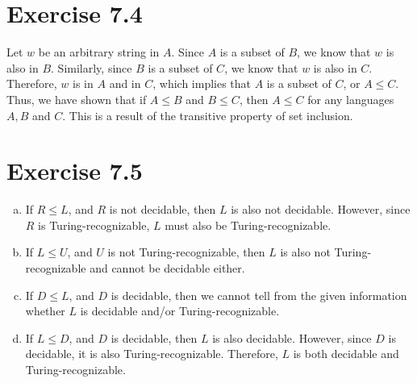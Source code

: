 \documentclass{article} %
\newcommand{\homeworkNumber}{7}
\begin{document}
\section*{Exercise \homeworkNumber.4}
Let $w$ be an arbitrary string in $A$. Since $A$ is a subset of $B$, we know that $w$ is also in $B$. Similarly, since $B$ is a subset of $C$, we know that $w$ is also in $C$. Therefore, $w$ is in $A$ and in $C$, which implies that $A$ is a subset of $C$, or $A \le C$.\\
Thus, we have shown that if $A \le B$ and $B \le C$, then $A \le C$ for any languages $A, B$ and $C$. This is a result of the transitive property of set inclusion.

\section*{Exercise \homeworkNumber.5}
\begin{enumerate}[(a)]
\item
If $R \le L$, and $R$ is not decidable, then $L$ is also not decidable. However, since $R$ is Turing-recognizable, $L$ must also be Turing-recognizable.
\item
If $L \le U$, and $U$ is not Turing-recognizable, then $L$ is also not Turing-recognizable and cannot be decidable either.
\item
If $D \le L$, and $D$ is decidable, then we cannot tell from the given information whether $L$ is decidable and/or Turing-recognizable.

\item
If $L \le D$, and $D$ is decidable, then $L$ is also decidable. However, since $D$ is decidable, it is also Turing-recognizable. Therefore, $L$ is both decidable and Turing-recognizable.
\end{enumerate}
\end{document}

